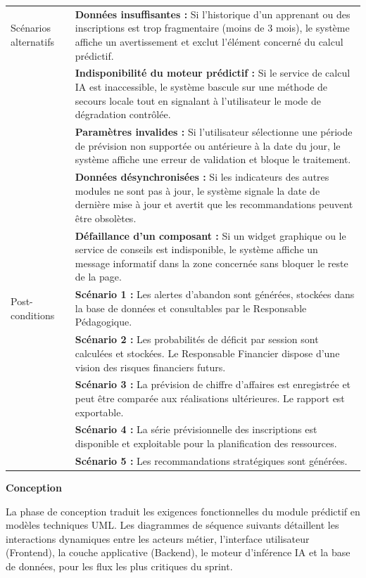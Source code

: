 {\begin{longtable}{|l|p{12cm}|}
Scénarios alternatifs &
\textbf{Données insuffisantes :} Si l'historique d'un apprenant ou des inscriptions est trop fragmentaire (moins de 3 mois), le système affiche un avertissement et exclut l'élément concerné du calcul prédictif. \\
& \textbf{Indisponibilité du moteur prédictif :} Si le service de calcul IA est inaccessible, le système bascule sur une méthode de secours locale tout en signalant à l'utilisateur le mode de dégradation contrôlée. \\
& \textbf{Paramètres invalides :} Si l'utilisateur sélectionne une période de prévision non supportée ou antérieure à la date du jour, le système affiche une erreur de validation et bloque le traitement. \\
& \textbf{Données désynchronisées :} Si les indicateurs des autres modules ne sont pas à jour, le système signale la date de dernière mise à jour et avertit que les recommandations peuvent être obsolètes. \\
& \textbf{Défaillance d'un composant :} Si un widget graphique ou le service de conseils est indisponible, le système affiche un message informatif dans la zone concernée sans bloquer le reste de la page. \\
\hline

Post-conditions &
\textbf{Scénario 1 :} Les alertes d'abandon sont générées, stockées dans la base de données et consultables par le Responsable Pédagogique. \\
& \textbf{Scénario 2 :} Les probabilités de déficit par session sont calculées et stockées. Le Responsable Financier dispose d'une vision des risques financiers futurs. \\
& \textbf{Scénario 3 :} La prévision de chiffre d'affaires est enregistrée et peut être comparée aux réalisations ultérieures. Le rapport est exportable. \\
& \textbf{Scénario 4 :} La série prévisionnelle des inscriptions est disponible et exploitable pour la planification des ressources. \\
& \textbf{Scénario 5 :} Les recommandations stratégiques sont générées. \\
\hline
\end{longtable}
}

\vspace{0.3cm}
\textbf{Conception}

La phase de conception traduit les exigences fonctionnelles du module prédictif en modèles techniques UML. Les diagrammes de séquence suivants détaillent les interactions dynamiques entre les acteurs métier, l'interface utilisateur (Frontend), la couche applicative (Backend), le moteur d'inférence IA et la base de données, pour les flux les plus critiques du sprint.

